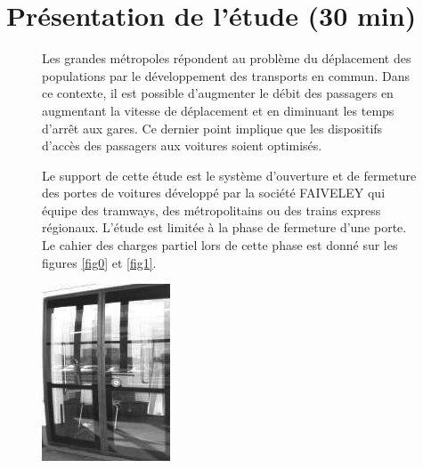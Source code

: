 \normalsize

\section{Présentation de l'étude (30 min)}

\begin{figure}[!h]
\begin{minipage}{0.6\linewidth}
Les grandes métropoles répondent au problème du déplacement des populations par le développement des transports en commun. Dans ce contexte, il est possible d'augmenter le débit des passagers en augmentant la vitesse de déplacement et en diminuant les temps d'arrêt aux gares. Ce dernier point implique que les dispositifs d'accès des passagers aux voitures soient optimisés.

Le support de cette étude est le système d'ouverture et de fermeture des portes de voitures développé par la société FAIVELEY qui équipe des tramways, des métropolitains ou des trains express régionaux. L'étude est limitée à la phase de fermeture d'une porte. Le cahier des charges partiel lors de cette phase est donné sur les figures \ref{fig0} et \ref{fig1}.
\end{minipage}
\hfill
\begin{minipage}{0.35\linewidth}
 \centering\includegraphics[width=0.8\linewidth]{img/Portes1.png}
\end{minipage}
\end{figure}

